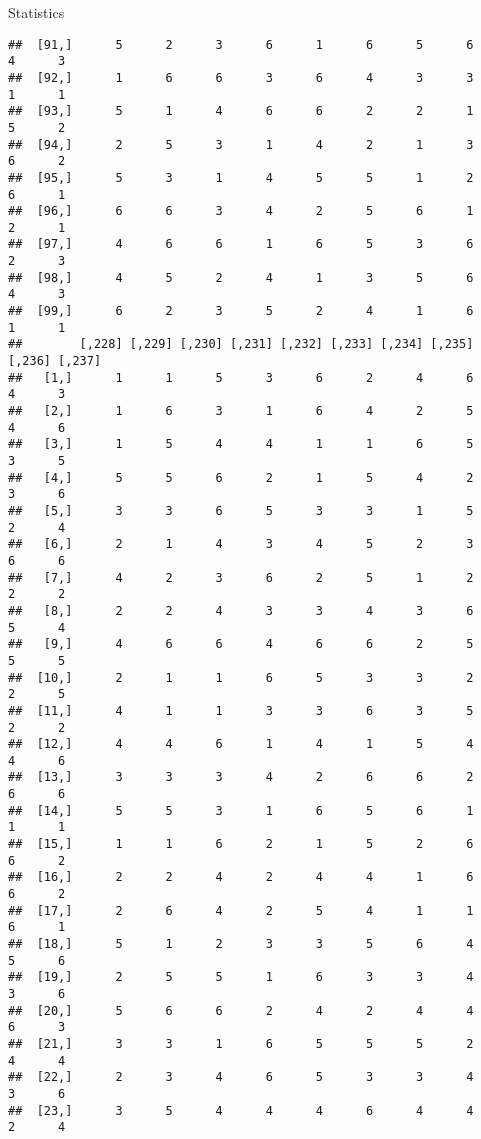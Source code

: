 \documentclass[
  ignorenonframetext,
]{beamer}
\begin{document}
\begin{frame}[fragile]{Statistics}
\begin{verbatim}
##  [91,]      5      2      3      6      1      6      5      6      4      3
##  [92,]      1      6      6      3      6      4      3      3      1      1
##  [93,]      5      1      4      6      6      2      2      1      5      2
##  [94,]      2      5      3      1      4      2      1      3      6      2
##  [95,]      5      3      1      4      5      5      1      2      6      1
##  [96,]      6      6      3      4      2      5      6      1      2      1
##  [97,]      4      6      6      1      6      5      3      6      2      3
##  [98,]      4      5      2      4      1      3      5      6      4      3
##  [99,]      6      2      3      5      2      4      1      6      1      1
##        [,228] [,229] [,230] [,231] [,232] [,233] [,234] [,235] [,236] [,237]
##   [1,]      1      1      5      3      6      2      4      6      4      3
##   [2,]      1      6      3      1      6      4      2      5      4      6
##   [3,]      1      5      4      4      1      1      6      5      3      5
##   [4,]      5      5      6      2      1      5      4      2      3      6
##   [5,]      3      3      6      5      3      3      1      5      2      4
##   [6,]      2      1      4      3      4      5      2      3      6      6
##   [7,]      4      2      3      6      2      5      1      2      2      2
##   [8,]      2      2      4      3      3      4      3      6      5      4
##   [9,]      4      6      6      4      6      6      2      5      5      5
##  [10,]      2      1      1      6      5      3      3      2      2      5
##  [11,]      4      1      1      3      3      6      3      5      2      2
##  [12,]      4      4      6      1      4      1      5      4      4      6
##  [13,]      3      3      3      4      2      6      6      2      6      6
##  [14,]      5      5      3      1      6      5      6      1      1      1
##  [15,]      1      1      6      2      1      5      2      6      6      2
##  [16,]      2      2      4      2      4      4      1      6      6      2
##  [17,]      2      6      4      2      5      4      1      1      6      1
##  [18,]      5      1      2      3      3      5      6      4      5      6
##  [19,]      2      5      5      1      6      3      3      4      3      6
##  [20,]      5      6      6      2      4      2      4      4      6      3
##  [21,]      3      3      1      6      5      5      5      2      4      4
##  [22,]      2      3      4      6      5      3      3      4      3      6
##  [23,]      3      5      4      4      4      6      4      4      2      4

\end{verbatim}
\end{frame}
\end{document}
